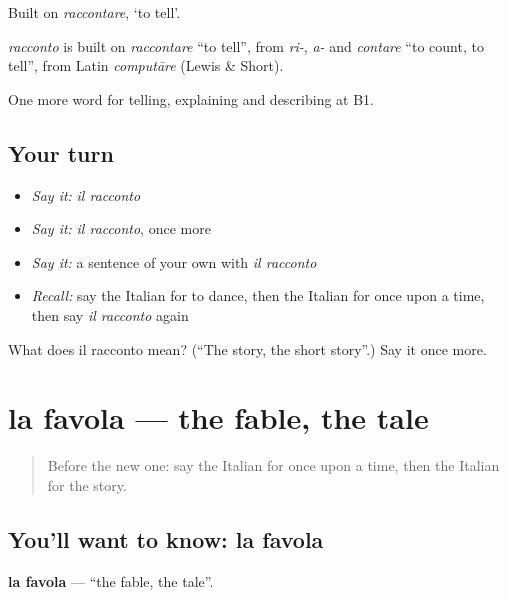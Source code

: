 Built on \emph{raccontare}, ‘to tell’.

\begin{cousinweb}
\emph{racconto} is built on \emph{raccontare} \textquotedblleft{}to tell\textquotedblright{}, from \emph{ri-}, \emph{a-} and \emph{contare} \textquotedblleft{}to count, to tell\textquotedblright{}, from Latin \emph{computāre} (Lewis \& Short).
\end{cousinweb}

\begin{grammarlens}[title={What you've built}]
One more word for telling, explaining and describing at B1.
\end{grammarlens}

\subsection*{Your turn}
\begin{itemize}
\raggedright
  \item \emph{Say it:} \emph{il racconto}
  \item \emph{Say it:} \emph{il racconto}, once more
  \item \emph{Say it:} a sentence of your own with \emph{il racconto}
  \item \emph{Recall:} say the Italian for to dance, then the Italian for once upon a time, then say \emph{il racconto} again
\end{itemize}

\begin{tcolorbox}[breakable,colback=teal!4,colframe=teal!35!black,title={Before you move on}]
What does il racconto mean? (\textquotedblleft{}The story, the short story\textquotedblright{}.) Say it once more.
\end{tcolorbox}
\section[la favola]{la favola — the fable, the tale}

\label{lesson:IT-C323-favola}



\begin{quote}
Before the new one: say the Italian for once upon a time, then the Italian for the story.
\end{quote}

\subsection*{You'll want to know: la favola}
\textbf{la favola} — \textquotedblleft{}the fable, the tale\textquotedblright{}.

